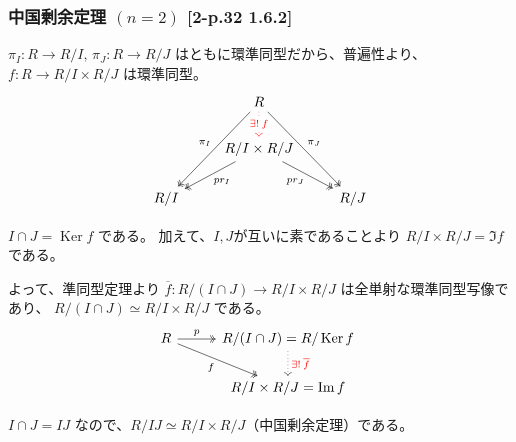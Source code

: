 \documentclass[twocolumn]{jsarticle}
\DeclareMathOperator{\Ker}{Ker}
\begin{document}
\subsubsection{中国剰余定理 \((n=2)\) [2-p.32 1.6.2]}
\(\pi_I\colon R \to R/I,\, \pi_J\colon R \to R/J\) はともに環準同型だから、普遍性より、\(f\colon R\to R/I\times R/J\) は環準同型。
\[
\begin{tikzcd}
    & R \arrow[d, red, "\exists!\: f" description, dotted] \arrow[ldd, "\pi_I"', two heads] \arrow[rdd, "\pi_J", two heads] & \\
    & R/I \times R/J \arrow[ld, "pr_I", two heads] \arrow[rd, "pr_J"', two heads] & \\
R/I & & R/J
\end{tikzcd}
\]

\(I\cap J = \Ker f\) である。
加えて、\(I,J\)が互いに素であることより \(R/I \times R/J = \Im f\) である。

よって、準同型定理より \(\overline{f}\colon R/(I\cap J) \to R/I \times R/J\) は全単射な環準同型写像であり、 \(R/(I\cap J) \simeq R/I \times R/J\) である。
\[
\begin{tikzcd}
  R \ar[r, "p", two heads] \ar[rd, "f"', two heads] & R/(I\cap J) = R / \Ker f  \ar[d, "\textcolor{red}{\exists! \: \overline{f}}", dotted] \\
  & \quad R/I \times R/J = \Im f\quad
\end{tikzcd}
\]

\(I \cap J = IJ\) なので、\(R/IJ \simeq R/I \times R/J\)（中国剰余定理）である。
\end{document}
